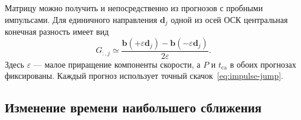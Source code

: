 \documentclass[a4paper,11pt]{article}
\newcommand{\vect}[1]{\boldsymbol{#1}}
\numberwithin{equation}{section}
\begin{document}
Матрицу можно получить и непосредственно из прогнозов с пробными
импульсами. Для единичного направления $\vect d_j$ одной из осей ОСК
центральная конечная разность имеет вид
\begin{equation}
 G_{:,j}\simeq
 \frac{\vect b(+\varepsilon\vect d_j)
       -\vect b(-\varepsilon\vect d_j)}{2\varepsilon}.
 \label{eq:G-finite-difference}
\end{equation}
Здесь $\varepsilon$ --- малое приращение компоненты скорости,
а $P$ и $t_{\mathrm{ca}}$ в обоих прогнозах фиксированы.
Каждый прогноз использует точный скачок~\eqref{eq:impulse-jump}.

\subsection{Изменение времени наибольшего сближения}
\end{document}
